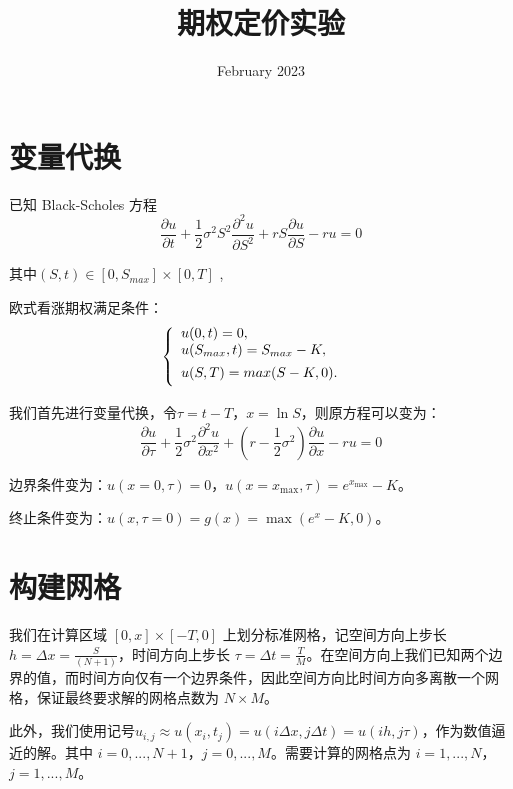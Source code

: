 \documentclass{article}
\title{期权定价实验}
\author{}
\date{February 2023}
\begin{document}
\maketitle


\vspace{2ex}

\section{变量代换}

已知 Black-Scholes 方程
$$\frac{\partial u}{\partial t} + \frac{1}{2}\sigma^2S^2\frac{\partial^2 u}{\partial S^2} + rS\frac{\partial u}{\partial S} - ru = 0$$

其中$(S, t) \in [0, S_{max}] × [0, T]$ ,

欧式看涨期权满足条件：
\begin{equation}
    \left\{
            \begin{array}{lr}
            u(0, t) = 0, & \\
            \vspace{1ex}
            u(S_{max}, t) = S_{max} - K, & \\
            \vspace{1ex}
            u(S, T) = max(S - K, 0). &  
            \end{array}
    \right.
    \nonumber
\end{equation}


\vspace{2ex}

我们首先进行变量代换，令$\tau = t-T$，$x = \ln S$，则原方程可以变为：
$$\frac{\partial u}{\partial \tau} + \frac{1}{2}\sigma^2\frac{\partial^2 u}{\partial x^2} + (r-\frac{1}{2}\sigma^2)\frac{\partial u}{\partial x} - r u = 0$$

边界条件变为：$u(x=0, \tau) = 0$，$u(x=x_{\max}, \tau) = e^{x_{\max}}-K$。

终止条件变为：$u(x,\tau=0) = g(x) = \max(e^x-K,0)$。


\newpage
\section{构建网格}
我们在计算区域 $[0, x] × [-T, 0]$ 上划分标准网格，记空间方向上步长 $h = \Delta x = \frac{S}{(N + 1)}$，时间方向上步长 $\tau = \Delta t = \frac{T}{M}$。在空间方向上我们已知两个边界的值，而时间方向仅有一个边界条件，因此空间方向比时间方向多离散一个网格，保证最终要求解的网格点数为 $N × M$。

此外，我们使用记号$u_{i,j} \approx u(x_i, t_j) = u(i\Delta x, j\Delta t) = u(ih, j\tau)$，作为数值逼近的解。其中 $i = 0,..., N + 1$，$j = 0,..., M$。需要计算的网格点为 $i = 1,..., N$，$j = 1,..., M$。
\end{document}
